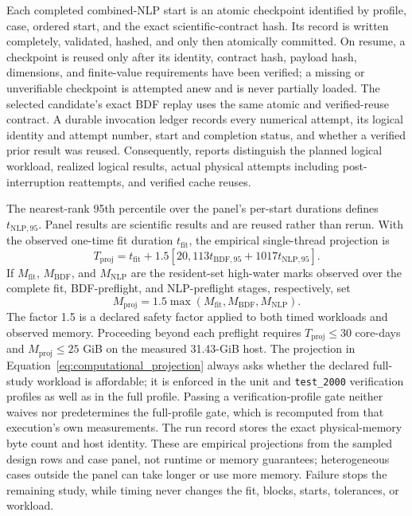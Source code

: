\documentclass[a4paper,fleqn]{cas-sc}
\begin{document}
Each completed combined-NLP start is an atomic checkpoint identified by profile, case, ordered start, and the exact scientific-contract hash. Its record is written completely, validated, hashed, and only then atomically committed. On resume, a checkpoint is reused only after its identity, contract hash, payload hash, dimensions, and finite-value requirements have been verified; a missing or unverifiable checkpoint is attempted anew and is never partially loaded. The selected candidate's exact BDF replay uses the same atomic and verified-reuse contract. A durable invocation ledger records every numerical attempt, its logical identity and attempt number, start and completion status, and whether a verified prior result was reused. Consequently, reports distinguish the planned logical workload, realized logical results, actual physical attempts including post-interruption reattempts, and verified cache reuses.

The nearest-rank 95th percentile over the panel's per-start durations defines $t_{\mathrm{NLP},95}$. Panel results are scientific results and are reused rather than rerun. With the observed one-time fit duration $t_{\mathrm{fit}}$, the empirical single-thread projection is
\begin{equation}
\label{eq:computational_projection}
T_{\mathrm{proj}}=t_{\mathrm{fit}}
+1.5\!\left[
20{,}113t_{\mathrm{BDF},95}
+1017t_{\mathrm{NLP},95}
\right].
\end{equation}
If $M_{\mathrm{fit}}$, $M_{\mathrm{BDF}}$, and $M_{\mathrm{NLP}}$ are the resident-set high-water marks observed over the complete fit, BDF-preflight, and NLP-preflight stages, respectively, set
\begin{equation}
M_{\mathrm{proj}}=1.5\max(M_{\mathrm{fit}},M_{\mathrm{BDF}},M_{\mathrm{NLP}}).
\end{equation}
The factor 1.5 is a declared safety factor applied to both timed workloads and observed memory. Proceeding beyond each preflight requires $T_{\mathrm{proj}}\leq30$ core-days and $M_{\mathrm{proj}}\leq25$ GiB on the measured 31.43-GiB host. The projection in Equation~\eqref{eq:computational_projection} always asks whether the declared full-study workload is affordable; it is enforced in the unit and \texttt{test\_2000} verification profiles as well as in the full profile. Passing a verification-profile gate neither waives nor predetermines the full-profile gate, which is recomputed from that execution's own measurements. The run record stores the exact physical-memory byte count and host identity. These are empirical projections from the sampled design rows and case panel, not runtime or memory guarantees; heterogeneous cases outside the panel can take longer or use more memory. Failure stops the remaining study, while timing never changes the fit, blocks, starts, tolerances, or workload.
\end{document}
